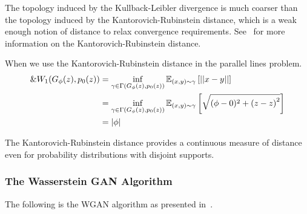 The topology induced by the Kullback-Leibler divergence is much coarser than the
topology induced by the Kantorovich-Rubinstein distance, which is a weak enough
notion of distance to relax convergence requirements.
See~\cite{ref:villani-2008} for more information on the Kantorovich-Rubinstein
distance.

\begin{example}
  When we use the Kantorovich-Rubinstein distance in the parallel lines problem.
  \begin{align}
    \&W_1(G_\phi(z), p_0(z)) & = \inf_{\gamma \in
                           \Gamma(G_\phi(z),p_0(z))}\mathbb{E}_{(x,y) \sim
                           \gamma} \left[ || x-y || \right] \\
                         & =\inf_{\gamma \in \Gamma(G_\phi(z),
                           p_0(z))}\mathbb{E}_{(x,y) \sim \gamma} \left[ \sqrt{(\phi - 0)^2 + {(z - z)}^2}
                           \right] \\
                         & =|\phi|
  \end{align}
\end{example}

The Kantorovich-Rubinstein distance provides a continuous measure of
distance even for probability distributions with disjoint supports.

\subsubsection*{The Wasserstein GAN Algorithm}

The following is the WGAN algorithm as presented in~\cite{ref:arjovsky-2017}.

